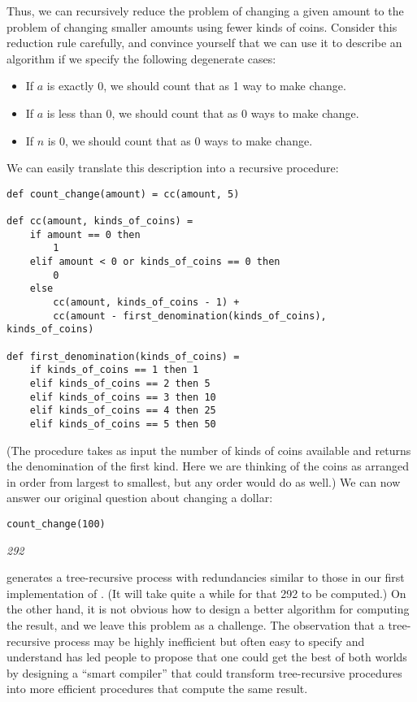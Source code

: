 Thus, we can recursively reduce the problem of changing a given amount to the problem of changing smaller amounts using fewer kinds of coins. Consider this reduction rule carefully, and convince yourself that we can use it to describe an algorithm if we specify the following degenerate cases:

\begin{itemize}
\item If $a$ is exactly 0, we should count that as 1 way to make change.
\item If $a$ is less than 0, we should count that as 0 ways to make change.
\item If $n$ is 0, we should count that as 0 ways to make change.
\end{itemize}

We can easily translate this description into a recursive procedure:

\begin{lstlisting}
def count_change(amount) = cc(amount, 5)

def cc(amount, kinds_of_coins) =
    if amount == 0 then
        1
    elif amount < 0 or kinds_of_coins == 0 then
        0
    else
        cc(amount, kinds_of_coins - 1) +
        cc(amount - first_denomination(kinds_of_coins), kinds_of_coins)

def first_denomination(kinds_of_coins) =
    if kinds_of_coins == 1 then 1
    elif kinds_of_coins == 2 then 5
    elif kinds_of_coins == 3 then 10
    elif kinds_of_coins == 4 then 25
    elif kinds_of_coins == 5 then 50
\end{lstlisting}

(The  procedure takes as input the number of kinds of coins available and returns the denomination of the first kind. Here we are thinking of the coins as arranged in order from largest to smallest, but any order would do as well.) We can now answer our original question about changing a dollar:

\begin{lstlisting}
count_change(100)
\end{lstlisting}
\textit{292}

 generates a tree-recursive process with redundancies similar to those in our first implementation of . (It will take quite a while for that 292 to be computed.) On the other hand, it is not obvious how to design a better algorithm for computing the result, and we leave this problem as a challenge. The observation that a tree-recursive process may be highly inefficient but often easy to specify and understand has led people to propose that one could get the best of both worlds by designing a ``smart compiler'' that could transform tree-recursive procedures into more efficient procedures that compute the same result.

